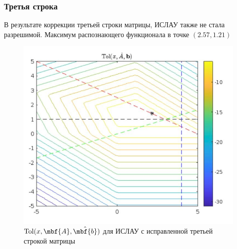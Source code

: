 \documentclass[12pt,a4paper]{article}
\begin{document}
        \subsubsection{Третья строка}
            В результате коррекции третьей строки матрицы, ИСЛАУ также не стала разрешимой. Максимум распознающего функционала в точке $(2.57, 1.21)$
            \begin{figure}[H]
                \centering
                \includegraphics[width=16cm]{tol_third.png}
                \caption{$\mathrm{Tol}(x,\mbf{A}, \hat{\mbf{b}})$ для ИСЛАУ с исправленной третьей строкой матрицы}
                \label{fig:aiverve}
            \end{figure}
\end{document}
